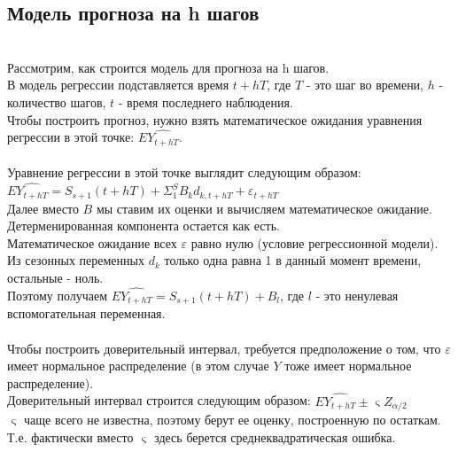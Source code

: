 \documentclass{article}
\begin{document}
\begin{itemize}
    \subsection{Модель прогноза на h шагов}
    \\Рассмотрим, как строится модель для прогноза на h шагов. 
    \\ В модель регрессии подставляется время $t + hT$, где $T$ - это шаг во времени, $h$ - количество шагов, $t$ - время последнего наблюдения. 
    \\Чтобы построить прогноз, нужно взять математическое ожидания уравнения регрессии в этой точке: $E\widehat{Y_{t+hT}}$.
    \\
    \\ Уравнение регрессии в этой точке выглядит следующим образом:
    \\ $E\widehat{Y_{t+hT}} = S_{s+1}(t + hT) + \Sigma_1^S B_kd_{k,t + hT} + \varepsilon_{t + hT}$
    \\ Далее вместо $B$ мы ставим их оценки и вычисляем математическое ожидание. 
    \\ Детерменированная компонента остается как есть.
    \\Математическое ожидание всех $\varepsilon$ равно нулю (условие регрессионной модели). 
    \\Из сезонных переменных $d_k$ только одна равна 1 в данный момент времени, остальные - ноль.
    \\ Поэтому получаем $E\widehat{Y_{t+hT}} = S_{s+1}(t + hT) + B_l$, где $l$ - это ненулевая вспомогательная переменная.
    \\
    \\ Чтобы построить доверительный интервал, требуется предположение о том, что $\varepsilon$ имеет нормальное распределение (в этом случае $Y$ тоже имеет нормальное распределение). 
    \\ Доверительный интервал строится следующим образом: $E\widehat{Y_{t+hT}} \pm \upvarsigma Z_{\alpha/2}$
    \\ $\upvarsigma$ чаще всего не известна, поэтому берут ее оценку, построенную по остаткам.
    \\Т.е. фактически вместо $\upvarsigma$ здесь берется среднеквадратическая ошибка.
    
\end{itemize}
\end{document}
